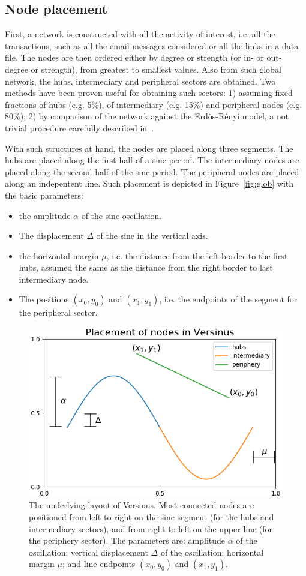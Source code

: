 \documentclass[runningheads]{llncs}
\begin{document}
\subsection{Node placement}
First, a network is constructed with all the activity of interest, i.e. all the transactions, such as all the email messages considered or all the links in a data file.
The nodes are then ordered either by degree or strength (or in- or out- degree or strength), from greatest to smallest values.
Also from such global network, the hubs, intermediary and peripheral sectors are obtained. Two methods have been proven useful for obtaining such sectors: 1) assuming fixed fractions of hubs (e.g. 5\%), of intermediary (e.g. 15\%) and peripheral nodes (e.g. 80\%); 2) by comparison of the network against the Erdös-Rényi model, a not trivial procedure carefully described in~\cite{stab}.

With such structures at hand, the nodes are placed along three segments.
The hubs are placed along the first half of a sine period.
The intermediary nodes are placed along the second half of the sine period.
The peripheral nodes are placed along an indepentent line.
Such placement is depicted in Figure~\ref{fig:glob} with
the basic parameters:
\begin{itemize}
  \item the amplitude $\alpha$ of the sine oscillation.
  \item The displacement $\Delta$ of the sine in the vertical axis.
  \item the horizontal margin $\mu$, i.e. the distance from the left border to the first hubs, assumed the same as the distance from the right border to last intermediary node.
  \item The positions $(x_0,y_0)$ and $(x_1,y_1)$, i.e. the endpoints of the segment for the peripheral sector.
\end{itemize}

\begin{figure}[!h]\centering
\includegraphics[width=.7\textwidth]{nodePositioning}
  \caption{The underlying layout of Versinus. Most connected nodes are positioned from left to right on the sine segment (for the hubs and intermediary sectors), and from right to left on the upper line (for the periphery sector). The parameters are: amplitude $\alpha$ of the oscillation; vertical displacement $\Delta$ of the oscillation; horizontal margin $\mu$; and line endpoints $(x_0, y_0)$ and $(x_1, y_1)$.}\label{fig1}
\end{figure}
\end{document}
